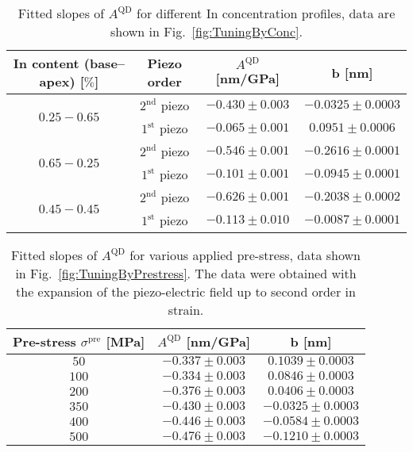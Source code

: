  		\begin{table}[ht!]
 			\centering
 			\caption{Fitted slopes of $A^{\mathrm{QD}}$ for different In concentration profiles, data are shown in Fig.~\ref{fig:TuningByConc}.}
 				\label{tab:conc_slopes}
 				\begin{tabular}{|c|c|c|c|}
 					\hline
 		In content (base--apex)	[$\%$]	& Piezo order	& $A^{\mathrm{QD}}$ [nm/GPa]    & b   [nm]    \\ \hline
 					\multirow{2}{*}{$0.25-0.65$} & $2^\mathrm{nd}$ piezo &$-0.430 \pm 0.003$  & $-0.0325 \pm 0.0003$      \\ \cline{2-4}
 			&	$1^\mathrm{st}$ piezo 	& $-0.065 \pm 0.001$  & $0.0951 \pm 0.0006$      \\ \hline
 			\multirow{2}{*}{$0.65-0.25$} & $2^\mathrm{nd}$ piezo &$-0.546 \pm 0.001$  & $-0.2616 \pm 0.0001$      \\ \cline{2-4}
 			&	$1^\mathrm{st}$ piezo 	& $-0.101 \pm 0.001$  & $-0.0945 \pm 0.0001$      \\ \hline
 			\multirow{2}{*}{$0.45-0.45$} & $2^\mathrm{nd}$ piezo &$-0.626 \pm 0.001$  & $-0.2038 \pm 0.0002$      \\ \cline{2-4}
 			&	$1^\mathrm{st}$ piezo 	& $-0.113 \pm 0.010$  & $-0.0087 \pm 0.0001 $     \\ \hline
 				\end{tabular}    
 			\end{table}
 			

 		\begin{table}[ht!]
 			\centering
 			\caption{Fitted slopes of $A^{\mathrm{QD}}$ for various applied pre-stress, data shown in Fig.~\ref{fig:TuningByPrestress}. The data were obtained with the expansion of the piezo-electric field up to second order in strain.}
 			\label{tab:prestress_slopes}
 			\begin{tabular}{|c|c|c|}
 				\hline
 				Pre-stress $\sigma^\mathrm{pre}$ [MPa]		& $A^{\mathrm{QD}}$ [nm/GPa]    & b   [nm]    \\ \hline
 				$50$  &$-0.337 \pm 0.003$  & $0.1039 \pm 0.0003 $    \\ \hline
 				$100$	&$-0.334 \pm 0.003$  & $0.0846 \pm 0.0003 $     \\ \hline
 				$200$  &$-0.376 \pm 0.003$  & $0.0406\pm 0.0003 $    \\ \hline
 				$350$	&$-0.430 \pm 0.003$  & $-0.0325 \pm 0.0003$      \\ \hline
 				$400$  &$-0.446 \pm 0.003$  & $-0.0584 \pm 0.0003$    \\ \hline
 				$500$	&$-0.476 \pm 0.003$  & $-0.1210 \pm 0.0003$      \\ \hline
 			\end{tabular}    
 		\end{table}


